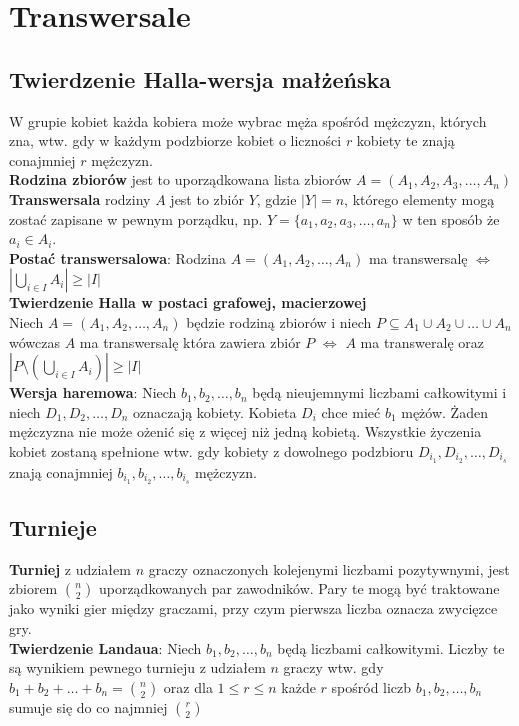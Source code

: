 \documentclass[a4paper,12pt]{article}
\begin{document}
\section{Transwersale}
\subsection{Twierdzenie Halla-wersja małżeńska}W grupie kobiet każda kobiera może wybrac męża spośród mężczyzn, których zna, wtw. gdy w każdym podzbiorze kobiet o liczności $r$ kobiety te znają conajmniej $r$ mężczyzn.\\
\textbf{Rodzina zbiorów} jest to uporządkowana lista zbiorów $A=(A_1,A_2,A_3,\hdots,A_n)$\\
\textbf{Transwersala} rodziny $A$ jest to zbiór $Y$, gdzie $|Y|=n$, którego elementy mogą zostać zapisane w pewnym porządku, np. $Y=\{ a_1, a_2, a_3,\hdots, a_n\}$ w ten sposób że $a_i\in A_i$.\\
\textbf{Postać transwersalowa}: Rodzina $A=(A_1, A_2, \dots, A_n)$ ma transwersalę $\Leftrightarrow$ $\left| \bigcup\limits_{i\in I}A_i\right|\geq |I|$\\
\textbf{Twierdzenie Halla w postaci grafowej, macierzowej}\\
Niech $A=(A_1, A_2, \dots, A_n)$ będzie rodziną zbiorów i niech $P\subseteq A_1 \cup A_2\cup \dots \cup A_n$ wówczas $A$ ma transwersalę która zawiera zbiór $P$ $\Leftrightarrow$ $A$ ma transweralę oraz $\left| P \setminus \left(\bigcup\limits_{i\in I}A_i\right)\right|\geq |I|$\\
\textbf{Wersja haremowa}: Niech $b_1, b_2, \dots , b_n$ będą nieujemnymi liczbami całkowitymi i niech $D_1, D_2, \dots, D_n$ oznaczają kobiety. Kobieta $D_i$ chce mieć $b_1$ mężów. Żaden mężczyzna nie może ożenić się z więcej niż jedną kobietą. Wszystkie życzenia kobiet zostaną spełnione wtw. gdy kobiety z dowolnego podzbioru $D_{i_1}, D_{i_2}, \dots, D_{i_s}$ znają conajmniej $b_{i_1}, b_{i_2}, \dots, b_{i_s}$ mężczyzn.
\subsection{Turnieje}
\textbf{Turniej} z udziałem $n$ graczy oznaczonych kolejenymi liczbami pozytywnymi, jest zbiorem $n\choose2$ uporządkowanych par zawodników. Pary te mogą być traktowane jako wyniki gier między graczami, przy czym pierwsza liczba oznacza zwycięzce gry.\\
\textbf{Twierdzenie Landaua}: Niech $b_1, b_2,\hdots,b_n$ będą liczbami całkowitymi. Liczby te są wynikiem pewnego turnieju z udziałem $n$ graczy wtw. gdy $b_1+b_2+\hdots+b_n={n\choose2}$ oraz dla $1\leq r \leq n$ każde $r$ spośród liczb $b_1, b_2,\hdots,b_n$ sumuje się do co najmniej $r\choose2$
\end{document}

